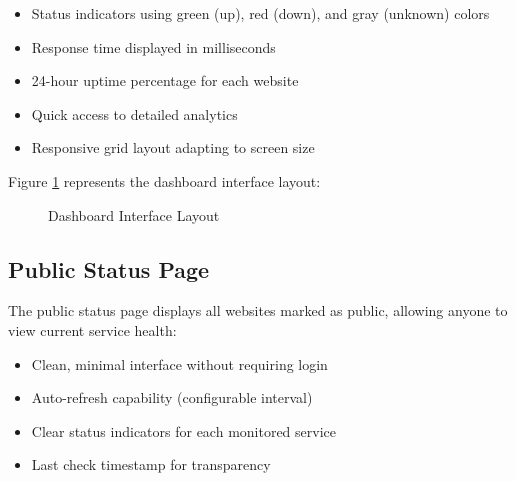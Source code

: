 \begin{itemize}
    \item Status indicators using green (up), red (down), and gray (unknown) colors
    \item Response time displayed in milliseconds
    \item 24-hour uptime percentage for each website
    \item Quick access to detailed analytics
    \item Responsive grid layout adapting to screen size
\end{itemize}

Figure \ref{fig:dashboard-result} represents the dashboard interface layout:

\begin{figure}[htbp]
    \centering
    \caption{Dashboard Interface Layout}
    \label{fig:dashboard-result}
\end{figure}

\subsection{Public Status Page}

The public status page displays all websites marked as public, allowing anyone to view current service health:

\begin{itemize}
    \item Clean, minimal interface without requiring login
    \item Auto-refresh capability (configurable interval)
    \item Clear status indicators for each monitored service
    \item Last check timestamp for transparency
\end{itemize}

